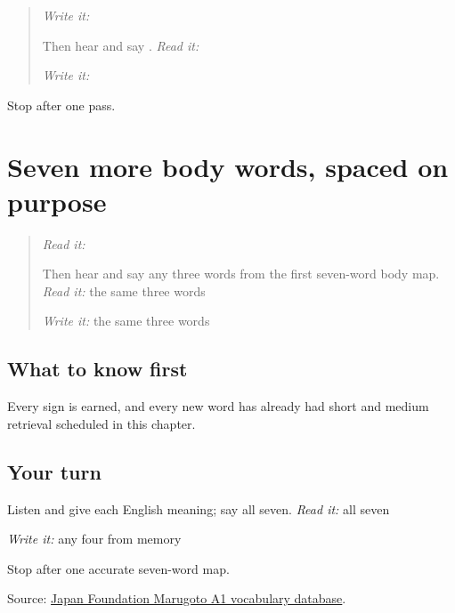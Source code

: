 \label{lesson:JA-R12-body-01}



\begin{quote}
\emph{Write it:} \textbf{}

Then hear and say \textbf{}. \emph{Read it:} \textbf{}

\emph{Write it:} \textbf{}
\end{quote}

\begin{tcolorbox}[breakable,colback=teal!4,colframe=teal!35!black,title={Before you move on}]
Stop after one pass.
\end{tcolorbox}
\section[\texorpdfstring{\ja{あたま・かみ・は} … (atama, kami, ha …)}{あたま・かみ・は … (atama, kami, ha …)}]{Seven more body words, spaced on purpose}

\label{lesson:JA-C12-body-map-two}



\begin{quote}
\emph{Read it:} \textbf{}

Then hear and say any three words from the first seven-word body map. \emph{Read it:} the same three words

\emph{Write it:} the same three words
\end{quote}

\subsection*{What to know first}
\begin{quote}
\textbf{}
\end{quote}

Every sign is earned, and every new word has already had short and medium retrieval scheduled in this chapter.

\subsection*{Your turn}
Listen and give each English meaning; say all seven. \emph{Read it:} all seven

\emph{Write it:} any four from memory

\begin{tcolorbox}[breakable,colback=teal!4,colframe=teal!35!black,title={Before you move on}]
Stop after one accurate seven-word map.

Source: \href{https://words.marugotoweb.jp/}{Japan Foundation Marugoto A1 vocabulary database}.
\end{tcolorbox}
